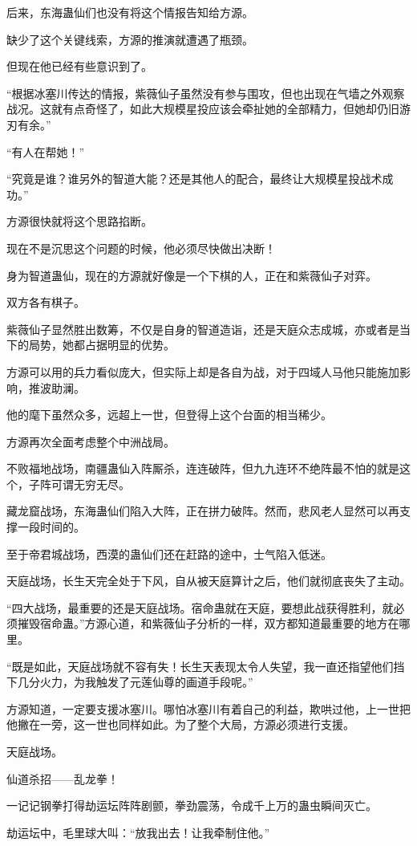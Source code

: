 \begin{this_body}
后来，东海蛊仙们也没有将这个情报告知给方源。

缺少了这个关键线索，方源的推演就遭遇了瓶颈。

但现在他已经有些意识到了。

“根据冰塞川传达的情报，紫薇仙子虽然没有参与围攻，但也出现在气墙之外观察战况。这就有点奇怪了，如此大规模星投应该会牵扯她的全部精力，但她却仍旧游刃有余。”

“有人在帮她！”

“究竟是谁？谁另外的智道大能？还是其他人的配合，最终让大规模星投战术成功。”

方源很快就将这个思路掐断。

现在不是沉思这个问题的时候，他必须尽快做出决断！

身为智道蛊仙，现在的方源就好像是一个下棋的人，正在和紫薇仙子对弈。

双方各有棋子。

紫薇仙子显然胜出数筹，不仅是自身的智道造诣，还是天庭众志成城，亦或者是当下的局势，她都占据明显的优势。

方源可以用的兵力看似庞大，但实际上却是各自为战，对于四域人马他只能施加影响，推波助澜。

他的麾下虽然众多，远超上一世，但登得上这个台面的相当稀少。

方源再次全面考虑整个中洲战局。

不败福地战场，南疆蛊仙入阵厮杀，连连破阵，但九九连环不绝阵最不怕的就是这个，子阵可谓无穷无尽。

藏龙窟战场，东海蛊仙们陷入大阵，正在拼力破阵。然而，悲风老人显然可以再支撑一段时间的。

至于帝君城战场，西漠的蛊仙们还在赶路的途中，士气陷入低迷。

天庭战场，长生天完全处于下风，自从被天庭算计之后，他们就彻底丧失了主动。

“四大战场，最重要的还是天庭战场。宿命蛊就在天庭，要想此战获得胜利，就必须摧毁宿命蛊。”方源心道，和紫薇仙子分析的一样，双方都知道最重要的地方在哪里。

“既是如此，天庭战场就不容有失！长生天表现太令人失望，我一直还指望他们挡下几分火力，为我触发了元莲仙尊的画道手段呢。”

方源知道，一定要支援冰塞川。哪怕冰塞川有着自己的利益，欺哄过他，上一世把他撇在一旁，这一世也同样如此。为了整个大局，方源必须进行支援。

天庭战场。

仙道杀招——乱龙拳！

一记记钢拳打得劫运坛阵阵剧颤，拳劲震荡，令成千上万的蛊虫瞬间灭亡。

劫运坛中，毛里球大叫：“放我出去！让我牵制住他。”


\end{this_body}
